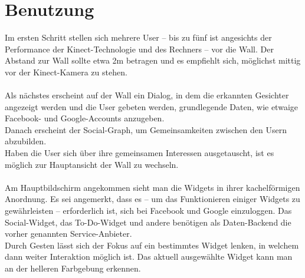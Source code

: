 \documentclass[10pt,a4paper]{report}
\begin{document}
\section{Benutzung}
Im ersten Schritt stellen sich mehrere User -- bis zu fünf ist angesichts der Performance der Kinect-Technologie und des Rechners -- vor die Wall. Der Abstand zur Wall sollte etwa 2m betragen und es empfiehlt sich, möglichst mittig vor der Kinect-Kamera zu stehen.
\\\\
Als nächstes erscheint auf der Wall ein Dialog, in dem die erkannten Gesichter angezeigt werden und die User gebeten werden, grundlegende Daten, wie etwaige Facebook- und Google-Accounts anzugeben. 
\\
Danach erscheint der Social-Graph, um Gemeinsamkeiten zwischen den Usern abzubilden.\\
Haben die User sich über ihre gemeinsamen Interessen ausgetauscht, ist es möglich zur Hauptansicht der Wall zu wechseln.
\\\\
Am Hauptbildschirm angekommen sieht man die Widgets in ihrer kachelförmigen Anordnung. Es sei angemerkt, dass es -- um das Funktionieren einiger Widgets zu gewährleisten -- erforderlich ist, sich bei Facebook und Google einzuloggen. Das Social-Widget, das To-Do-Widget und andere benötigen als Daten-Backend die vorher genannten Service-Anbieter.\\
Durch Gesten lässt sich der Fokus auf ein bestimmtes Widget lenken, in welchem dann weiter Interaktion möglich ist. Das aktuell ausgewählte Widget kann man an der helleren Farbgebung erkennen.
\end{document}
